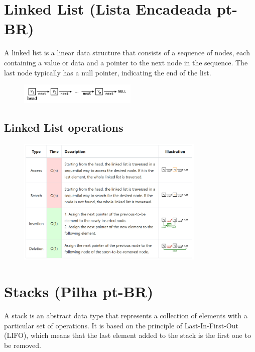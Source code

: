 \documentclass{article}
\begin{document}
\section{Linked List (Lista Encadeada pt-BR)}

A linked list is a linear data structure that consists of a sequence of nodes, each containing a value or data and a pointer to the next node in the sequence. The last node typically has a null pointer, indicating the end of the list.

\begin{figure}[!ht]
    \centering
    \includegraphics*[width=0.5\textwidth]{images/llist.png}
\end{figure}

\subsection{Linked List operations}

\begin{figure}[!ht]
    \centering
    \includegraphics*[width=0.8\textwidth]{images/llist_operations.png}
\end{figure}

\section{Stacks (Pilha pt-BR)} 

A stack is an abstract data type that represents a collection of elements with a particular set of operations. It is based on the principle of Last-In-First-Out (LIFO), which means that the last element added to the stack is the first one to be removed.
\end{document}
